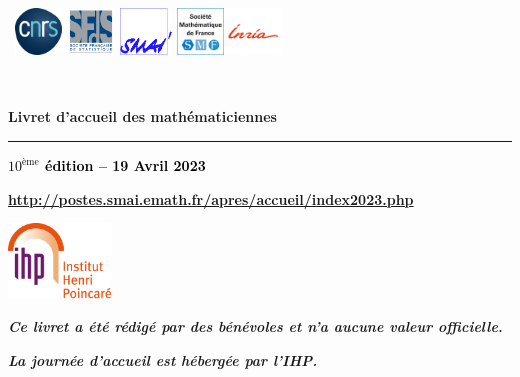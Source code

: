 \documentclass[11pt]{book}
\renewcommand*{\mp}{\textperiodcentered}
\newcommand{\verifier}[1]{\textcolor{black}{#1}}
\begin{document}
\renewcommand{\labelitemi}{$\bullet$}
\setlength{\parindent}{0cm}

{\pagestyle{empty}
%
~\hfill\includegraphics[height=1.25cm]{Images/CNRS}\hfill\includegraphics[height=1.25cm]{Images/sfds}\hfill\includegraphics[height=1.25cm]{Images/SMAI}
\hfill\includegraphics[height=1.25cm]{Images/smf}\hfill\includegraphics[height=1.25cm]{Images/inria_fr}\hfill~

~

\vfill

\textbf{\Huge Livret d'accueil des math\'ematicien\mp ne\mp s}

\hrule

\begin{flushright}
\textbf{\Large \verifier{$10^\text{\`eme}$ \'edition -- 19 Avril 2023}}
\end{flushright}

\vskip 2cm

\begin{center}

\textbf{\large \url{http://postes.smai.emath.fr/apres/accueil/index2023.php}}

\vfill

\includegraphics[height=2cm]{Images/IHP} 

\bigskip

\textit{\textbf{Ce livret a \'et\'e r\'edig\'e par des b\'en\'evoles
et n'a aucune valeur officielle.}}

\textit{\textbf{La journ\'ee d'accueil est h\'eberg\'ee par l'IHP.}}

\end{center}

\newpage

~

\newpage

\tableofcontents

\newpage
}
\end{document}

